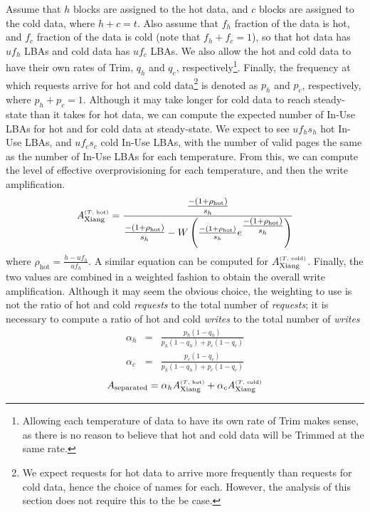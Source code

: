 \documentclass[prodmode,acmtos]{acmsmall}
\begin{document}
Assume that $h$ blocks are assigned to the hot data, and $c$ blocks are assigned to the cold data, where $h+c=t$.  Also assume that $f_h$ fraction of the data is hot, and $f_c$ fraction of the data is cold (note that $f_h + f_c = 1$), so that hot data has $u f_h$ LBAs and cold data has $u f_c$ LBAs.  We also allow the hot and cold data to have their own rates of Trim, $q_h$ and $q_c$, respectively\footnote{Allowing each temperature of data to have its own rate of Trim makes sense, as there is no reason to believe that hot and cold data will be Trimmed at the same rate.}.  Finally, the frequency at which requests arrive for hot and cold data\footnote{We expect requests for hot data to arrive more frequently than requests for cold data, hence the choice of names for each.  However, the analysis of this section does not require this to the be case.} is denoted as $p_h$ and $p_c$, respectively, where $p_h + p_c = 1$.  Although it may take longer for cold data to reach steady-state than it takes for hot data, we can compute the expected number of In-Use LBAs for hot and for cold data at steady-state.  We expect to see $u f_h s_h$ hot In-Use LBAs, and $u f_c s_c$ cold In-Use LBAs, with the number of valid pages the same as the number of In-Use LBAs for each temperature.  From this, we can compute the level of effective overprovisioning for each temperature, and then the write amplification.
\begin{equation}\label{eqn:write_amp_hot}
A_\text{Xiang}^{\text{\tiny ($T$, hot)}} = \frac{\text{\large${\frac{-(1+\rho_\text{hot})}{s_h}}$}} {\text{\large${\frac{-(1+\rho_\text{hot})}{s_h}}$} - W\left(\frac{-(1+\rho_\text{hot})}{s_h} e^\text{\large${\frac{-(1+\rho_\text{hot})}{s_h}}$}\right)}
\end{equation}
where $\rho_\text{hot} = \frac{h - u f_h}{u f_h}$.  A similar equation can be computed for $A_\text{Xiang}^{\text{\tiny ($T$, cold)}}$.  Finally, the two values are combined in a weighted fashion to obtain the overall write amplification.  Although it may seem the obvious choice, the weighting to use is not the ratio of hot and cold \emph{requests} to the total number of \emph{requests}; it is necessary to compute a ratio of hot and cold \emph{writes} to the total number of \emph{writes}
\begin{eqnarray}
\alpha_h &=& \frac{p_h(1-q_h)}{p_h(1-q_h) + p_c(1-q_c)} \\
\alpha_c &=& \frac{p_c(1-q_c)}{p_h(1-q_h) + p_c(1-q_c)}
\end{eqnarray}
\begin{equation}
A_\text{separated} = \alpha_h A_\text{Xiang}^{\text{\tiny ($T$, hot)}} + \alpha_c A_\text{Xiang}^{\text{\tiny ($T$, cold)}}
\end{equation}
\end{document}
